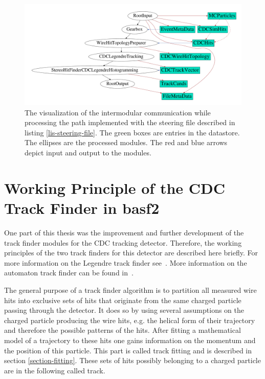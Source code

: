 \begin{figure}
 \centering
 \includegraphics[width=\linewidth]{figures/theory/dataflow.pdf}
 \caption[Visualization of intermodular communication.]{The visualization of the intermodular communication while processing the path implemented with the steering file described in listing \ref{lis-steering-file}. The green boxes are entries in the datastore. The ellipses are the processed modules. The red and blue arrows depict input and output to the modules.}
 \label{fig-viz-datastore}
\end{figure}


\section{Working Principle of the CDC Track Finder in basf2}

One part of this thesis was the improvement and further development of the track finder modules for the CDC tracking detector. Therefore, the working principles of the two track finders for this detector are described here briefly. For more information on the Legendre track finder see~\cite{kronenbitter}. More information on the automaton track finder can be found in~\cite{oliver}.

The general purpose of a track finder algorithm is to partition all measured wire hits into exclusive sets of hits that originate from the same charged particle passing through the detector. It does so by using several assumptions on the charged particle producing the wire hits, e.g. the helical form of their trajectory and therefore the possible patterns of the hits. After fitting a mathematical model of a trajectory to these hits one gains information on the momentum and the position of this particle. This part is called track fitting and is described in section \ref{section-fitting}. These sets of hits possibly belonging to a charged particle are in the following called track.

